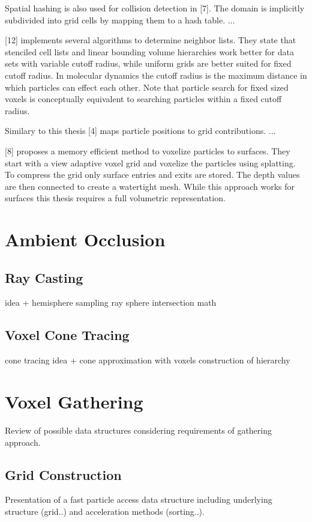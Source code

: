 \documentclass[hyperref,german,diplominf]{cgvpub}
\begin{document}
Spatial hashing is also used for collision detection in [7]. The domain is implicitly subdivided into grid cells by mapping them to a hash table. ...

[12] implements several algorithms to determine neighbor lists. They state that stenciled cell lists and linear bounding volume hierarchies work better for data sets with variable cutoff radius, while uniform grids are better suited for fixed cutoff radius. In molecular dynamics the cutoff radius is the maximum distance in which particles can effect each other. Note that particle search for fixed sized voxels is conceptually equivalent to searching particles within a fixed cutoff radius.

Similary to this thesis [4] maps particle positions to grid  contributions. ...

[8] proposes a memory efficient method to voxelize particles to surfaces. They start with a view adaptive voxel grid and voxelize the particles using splatting. To compress the grid only surface entries and exits are stored. The depth values are then connected to create a watertight mesh. While this approach works for surfaces this thesis requires a full volumetric representation.

\chapter{Ambient Occlusion}

\section{Ray Casting}
idea + hemisphere sampling
ray sphere intersection math

\section{Voxel Cone Tracing}
cone tracing idea + cone approximation with voxels
construction of hierarchy

\chapter{Voxel Gathering}
Review of possible data structures considering requirements of gathering approach.
\section{Grid Construction}
Presentation of a fast particle access data structure including underlying structure (grid..) and acceleration methods (sorting..).
\end{document}
